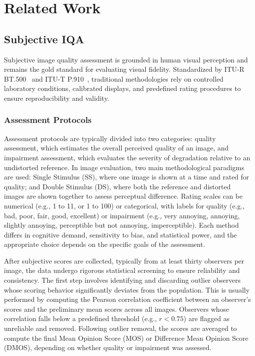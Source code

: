 \chapter{Related Work}\label{chap:related_work}

\section{Subjective IQA}\label{sec:subjective_iqa}

Subjective image quality assessment is grounded in human visual perception and remains the gold standard for evaluating visual fidelity. Standardized by ITU-R BT.500~\cite{ITU-R-BT500} and ITU-T P.910~\cite{itut2006}, traditional methodologies rely on controlled laboratory conditions, calibrated displays, and predefined rating procedures to ensure reproducibility and validity.

\subsection{Assessment Protocols}\label{sec:assessment_protocols}

Assessment protocols are typically divided into two categories: quality assessment, which estimates the overall perceived quality of an image, and impairment assessment, which evaluates the severity of degradation relative to an undistorted reference. In image evaluation, two main methodological paradigms are used: Single Stimulus (SS), where one image is shown at a time and rated for quality; and Double Stimulus (DS), where both the reference and distorted images are shown together to assess perceptual difference. Rating scales can be numerical (e.g., 1 to 11, or 1 to 100) or categorical, with labels for quality (e.g., bad, poor, fair, good, excellent) or impairment (e.g., very annoying, annoying, slightly annoying, perceptible but not annoying, imperceptible). Each method differs in cognitive demand, sensitivity to bias, and statistical power, and the appropriate choice depends on the specific goals of the assessment.

After subjective scores are collected, typically from at least thirty observers per image, the data undergo rigorous statistical screening to ensure reliability and consistency. The first step involves identifying and discarding outlier observers whose scoring behavior significantly deviates from the population. This is usually performed by computing the Pearson correlation coefficient between an observer's scores and the preliminary mean scores across all images. Observers whose correlation falls below a predefined threshold (e.g., $r < 0.75$) are flagged as unreliable and removed. Following outlier removal, the scores are averaged to compute the final Mean Opinion Score (MOS) or Difference Mean Opinion Score (DMOS), depending on whether quality or impairment was assessed.

